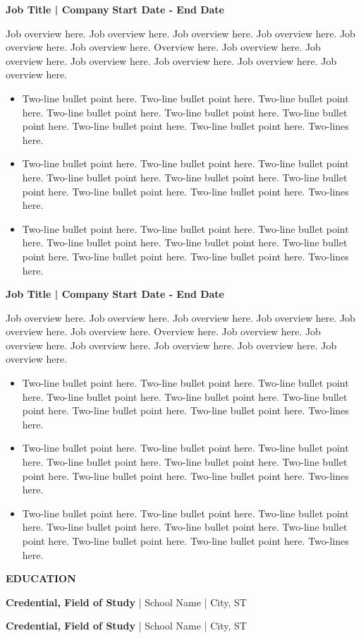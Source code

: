 \documentclass[11pt,letterpaper]{article}
\newcommand{\headertext}[1]{\begin{center}\textbf{\large #1}\end{center}}
\begin{document}
\noindent\textbf{Job Title | Company} \hfill \textbf{Start Date - End Date}

\vspace{0.1cm}
\small{Job overview here. Job overview here. Job overview here. Job overview here. Job overview here. Job overview here. Overview here. Job overview here. Job overview here. Job overview here. Job overview here. Job overview here. Job overview here.}

\begin{itemize}[leftmargin=*, itemsep=0pt, parsep=0pt]
    \item Two-line bullet point here. Two-line bullet point here. Two-line bullet point here. Two-line bullet point here. Two-line bullet point here. Two-line bullet point here. Two-line bullet point here. Two-line bullet point here. Two-lines here.
    \item Two-line bullet point here. Two-line bullet point here. Two-line bullet point here. Two-line bullet point here. Two-line bullet point here. Two-line bullet point here. Two-line bullet point here. Two-line bullet point here. Two-lines here.
    \item Two-line bullet point here. Two-line bullet point here. Two-line bullet point here. Two-line bullet point here. Two-line bullet point here. Two-line bullet point here. Two-line bullet point here. Two-line bullet point here. Two-lines here.
\end{itemize}

\vspace{0.3cm}

\noindent\textbf{Job Title | Company} \hfill \textbf{Start Date - End Date}

\vspace{0.1cm}
\small{Job overview here. Job overview here. Job overview here. Job overview here. Job overview here. Job overview here. Overview here. Job overview here. Job overview here. Job overview here. Job overview here. Job overview here. Job overview here.}

\begin{itemize}[leftmargin=*, itemsep=0pt, parsep=0pt]
    \item Two-line bullet point here. Two-line bullet point here. Two-line bullet point here. Two-line bullet point here. Two-line bullet point here. Two-line bullet point here. Two-line bullet point here. Two-line bullet point here. Two-lines here.
    \item Two-line bullet point here. Two-line bullet point here. Two-line bullet point here. Two-line bullet point here. Two-line bullet point here. Two-line bullet point here. Two-line bullet point here. Two-line bullet point here. Two-lines here.
    \item Two-line bullet point here. Two-line bullet point here. Two-line bullet point here. Two-line bullet point here. Two-line bullet point here. Two-line bullet point here. Two-line bullet point here. Two-line bullet point here. Two-lines here.
\end{itemize}

\vspace{0.5cm}

\headertext{EDUCATION}

\vspace{0.2cm}

\noindent\textbf{Credential, Field of Study} | School Name | City, ST

\vspace{0.1cm}

\noindent\textbf{Credential, Field of Study} | School Name | City, ST
\end{document}
